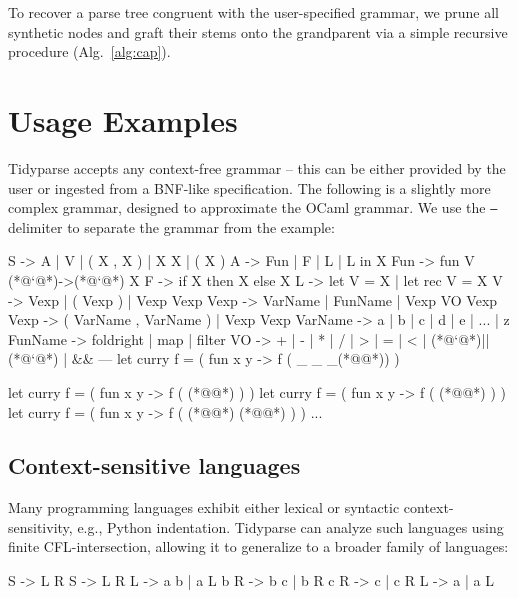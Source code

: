 \documentclass[sigplan,nonacm]{acmart}\settopmatter{printfolios=false,printccs=false,printacmref=false}
\begin{document}
\noindent To recover a parse tree congruent with the user-specified grammar, we prune all synthetic nodes and graft their stems onto the grandparent via a simple recursive procedure (Alg.~\ref{alg:cap}).%

\section{Usage Examples}

Tidyparse accepts any context-free grammar -- this can be either provided by the user or ingested from a BNF-like specification. The following is a slightly more complex grammar, designed to approximate the OCaml grammar. We use the \texttt{---} delimiter to separate the grammar from the example:

\begin{tidyinput}
S -> A | V | ( X , X ) | X X | ( X )
A -> Fun | F | L | L in X
Fun -> fun V (*@`@*)->(*@`@*) X
F -> if X then X else X
L -> let V = X | let rec V = X
V -> Vexp | ( Vexp ) | Vexp Vexp
Vexp -> VarName | FunName | Vexp VO Vexp
Vexp -> ( VarName , VarName ) | Vexp Vexp
VarName -> a | b | c | d | e | ... | z
FunName -> foldright | map | filter
VO ->  + | - | * | / | > | = | < | (*@`@*)||(*@`@*) | &&
---
let curry f = ( fun x y -> f ( _ _ _(*@\caret{ }@*)) )
\end{tidyinput}
\begin{tidyoutput}
let curry f = ( fun x y -> f ( (*@@*) ) )
let curry f = ( fun x y -> f ( (*@@*) ) )
let curry f = ( fun x y -> f ( (*@@*) (*@@*) ) )
...
\end{tidyoutput}

\subsection{Context-sensitive languages}

Many programming languages exhibit either lexical or syntactic context-sensitivity, e.g., Python indentation. Tidyparse can analyze such languages using finite CFL-intersection, allowing it to generalize to a broader family of languages:

\begin{tidyinput}
S -> L R                  S -> L R
L -> a b | a L b          R -> b c | b R c
R -> c | c R              L -> a | a L
\end{tidyinput}
\end{document}
